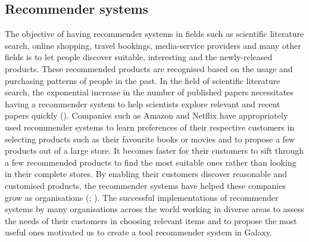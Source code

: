 \documentclass{bioinfo}
\begin{document}
\subsection{Recommender systems}
The objective of having recommender systems in fields such as scientific literature search, online shopping, travel bookings, media-service providers and many other fields is to let people discover suitable, interesting and the newly-released products. These recommended products are recognised based on the usage and purchasing patterns of people in the past. In the field of scientific literature search, the exponential increase in the number of published papers necessitates having a recommender system to help scientists explore relevant and recent papers quickly (\cite{Gipp2009SciensteinA}). Companies such as Amazon and Netflix have appropriately used recommender systems to learn preferences of their respective customers in selecting products such as their favourite books or movies and to propose a few products out of a large store. It becomes faster for their customers to sift through a few recommended products to find the most suitable ones rather than looking in their complete stores. By enabling their customers discover reasonable and customised products, the recommender systems have helped these companies grow as organisations (\cite{BSmith}; \cite{SGomezUribe}). The successful implementations of recommender systems by many organisations across the world working in diverse areas to assess the needs of their customers in choosing relevant items and to propose the most useful ones motivated us to create a tool recommender system in Galaxy.
\end{document}
